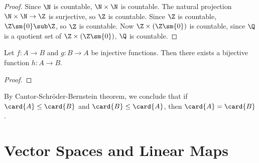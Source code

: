 \documentclass[10pt]{article}
\begin{document}
\begin{proof}
    Since $\N$ is countable, $\N\times\N$ is countable. The natural projection $\N\times\N\to\Z$ is surjective, so $\Z$ is countable. Since $\Z$ is countable, $\Z\sm\{0\}\sub\Z$, so $\Z$ is countable. Now $\Z\times(\Z\sm\{0\})$ is countable, since $\Q$ is a quotient set of $\Z\times(\Z\sm\{0\})$, $\Q$ is countable.
\end{proof}
\begin{theorem}
    Let $f:A\to B$ and $g:B\to A$ be injective functions. Then there exists a bijective function $h:A\to B$.
\end{theorem}
\begin{proof}
    
\end{proof}
\par
By Cantor-Schröder-Bernstein theorem, we conclude that if $\card{A}\le\card{B}$ and $\card{B}\le\card{A}$, then $\card{A}=\card{B}$.
\newpage
\section{Vector Spaces and Linear Maps}

\newpage
\end{document}
